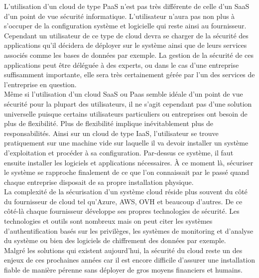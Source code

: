 \documentclass[a4paper, 12pt]{article}
\begin{document}
\begin{spacing}{1.1}
      L'utilisation d'un cloud de type PaaS n'est pas très différente de
      celle d'un SaaS d'un point de vue sécurité informatique. L'utilisateur
      n'aura pas non plus à s'occuper de la configuration système et logicielle
      qui reste ainsi au fournisseur. Cependant un utilisateur de ce type de
      cloud devra se charger de la sécurité des applications qu'il décidera de
      déployer sur le système ainsi que de leurs services associés comme les
      bases de données par exemple. La gestion de la sécurité de ces
      applications peut être déléguée à des experts, ou dans le cas d'une
      entreprise suffisamment importante, elle sera très certainement gérée
      par l'un des services de l'entreprise en question. \\

      Même si l'utilisation d'un cloud SaaS ou Paas semble idéale d'un point
      de vue sécurité pour la plupart des utilisateurs, il ne s'agit cependant
      pas d'une solution universelle puisque certains utilisateurs particuliers
      ou entreprises ont besoin de plus de flexibilité. Plus de flexibilité
      implique inévitablement plus de responsabilités. Ainsi sur un cloud de
      type IaaS, l'utilisateur se trouve pratiquement sur une machine vide sur
      laquelle il va devoir installer un système d'exploitation et procéder à
      sa configuration. Par-dessus ce système, il faut ensuite installer les
      logiciels et applications nécessaires. À ce moment là, sécuriser le
      système se rapproche finalement de ce que l'on connaissait par le passé
      quand chaque entreprise disposait de sa propre installation physique. \\

      La complexité de la sécurisation d'un système cloud réside plus souvent
      du côté du fournisseur de cloud tel qu'Azure, AWS, OVH et beaucoup
      d'autres. De ce côté-là chaque fournisseur développe ses propres
      technologies de sécurité. Les technologies et outils sont nombreux mais
      on peut citer les systèmes d'authentification basés sur les privilèges,
      les systèmes de monitoring et d'analyse du système ou bien des logiciels
      de chiffrement des données par exemple. \\

      Malgré les solutions qui existent aujourd'hui, la sécurité du cloud
      reste un des enjeux de ces prochaines années car il est encore difficile
      d'assurer une installation fiable de manière pérenne sans déployer de
      gros moyens financiers et humains.


\end{spacing}
\end{document}
